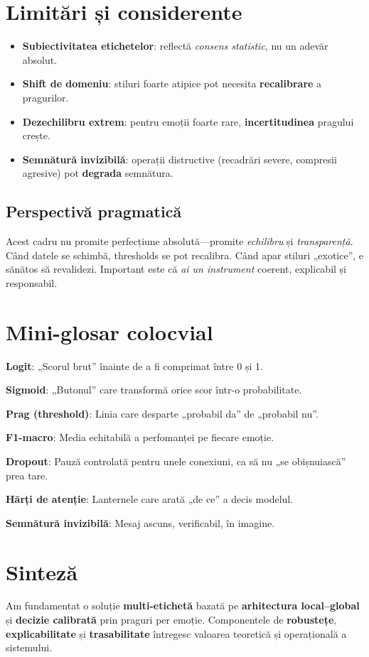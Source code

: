 \section{Limitări și considerente}
\label{sec:limitari}
\begin{itemize}
  \item \textbf{Subiectivitatea etichetelor}: reflectă \emph{consens statistic}, nu un adevăr absolut.
  \item \textbf{Shift de domeniu}: stiluri foarte atipice pot necesita \textbf{recalibrare} a pragurilor.
  \item \textbf{Dezechilibru extrem}: pentru emoții foarte rare, \textbf{incertitudinea} pragului crește.
  \item \textbf{Semnătură invizibilă}: operații distructive (recadrări severe, compresii agresive) pot \textbf{degrada} semnătura.
\end{itemize}

\subsection{Perspectivă pragmatică}
Acest cadru nu promite perfecțiune absolută—promite \emph{echilibru} și \emph{transparență}. Când datele se schimbă, thresholds se pot recalibra. Când apar stiluri „exotice”, e sănătos să revalidezi. Important este că \emph{ai un instrument} coerent, explicabil și responsabil.

\section{Mini-glosar colocvial}
\noindent\textbf{Logit}: „Scorul brut” înainte de a fi comprimat între 0 și 1.\par
\noindent\textbf{Sigmoid}: „Butonul” care transformă orice scor într-o probabilitate.\par
\noindent\textbf{Prag (threshold)}: Linia care desparte „probabil da” de „probabil nu”.\par
\noindent\textbf{F1-macro}: Media echitabilă a perfomanței pe fiecare emoție.\par
\noindent\textbf{Dropout}: Pauză controlată pentru unele conexiuni, ca să nu „se obișnuiască” prea tare.\par
\noindent\textbf{Hărți de atenție}: Lanternele care arată „de ce” a decis modelul.\par
\noindent\textbf{Semnătură invizibilă}: Mesaj ascuns, verificabil, în imagine.

\section{Sinteză}
\label{sec:concl}
Am fundamentat o soluție \textbf{multi-etichetă} bazată pe \textbf{arhitectura local–global} și \textbf{decizie calibrată} prin praguri per emoție. Componentele de \textbf{robustețe}, \textbf{explicabilitate} și \textbf{trasabilitate} întregesc valoarea teoretică și operațională a sistemului. 
\medskip

